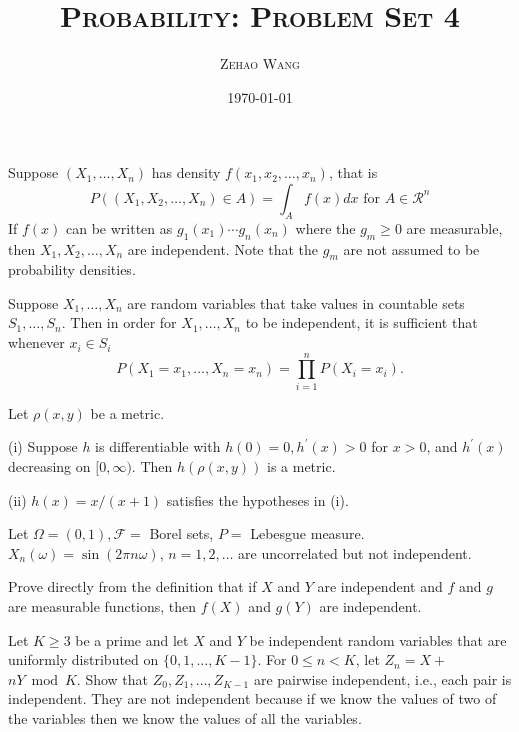\documentclass[en, normal, 11pt, black]{elegantnote}
\title{\textsc{Probability: Problem Set 4}}
\author{\textsc{Zehao Wang}}
\date{\today}
\newenvironment{exercise}[1]{\begin{tcolorbox}[colback=black!15, colframe=black!80, breakable, title=#1]}{\end{tcolorbox}}
\begin{document}
    \maketitle
    \begin{exercise}{2.1.1}
        Suppose $\left(X_{1}, \ldots, X_{n}\right)$ has density $f\left(x_{1}, x_{2}, \ldots, x_{n}\right)$, that is
        \[
        P\left(\left(X_{1}, X_{2}, \ldots, X_{n}\right) \in A\right)=\int_{A} f(x) d x \text { for } A \in \mathcal{R}^{n}
        \]
        If $f(x)$ can be written as $g_{1}\left(x_{1}\right) \cdots g_{n}\left(x_{n}\right)$ where the $g_{m} \geq 0$ are measurable, then $X_{1}, X_{2}, \ldots, X_{n}$ are independent. Note that the $g_{m}$ are not assumed to be probability densities. 
    \end{exercise}

    \begin{exercise}{2.1.2}
         Suppose $X_{1}, \ldots, X_{n}$ are random variables that take values in countable sets $S_{1}, \ldots, S_{n} .$ Then in order for $X_{1}, \ldots, X_{n}$ to be independent, it is sufficient that whenever $x_{i} \in S_{i}$
         \[
             P\left(X_{1}=x_{1}, \ldots, X_{n}=x_{n}\right)=\prod_{i=1}^{n} P\left(X_{i}=x_{i}\right). 
         \]
    \end{exercise}

    \begin{exercise}{2.1.3}
        Let $\rho(x, y)$ be a metric. 
        
        (i) Suppose $h$ is differentiable with $h(0)=0, h^{\prime}(x)>0$ for $x>0$, and $h^{\prime}(x)$ decreasing on $[0, \infty)$. Then $h(\rho(x, y))$ is a metric. 
        
        (ii) $h(x)=x /(x+1)$ satisfies the hypotheses in (i). 
    \end{exercise}

    \begin{exercise}{2.1.4}
        Let $\Omega=(0,1), \mathcal{F}=$ Borel sets, $P=$ Lebesgue measure. $X_{n}(\omega)=\sin (2 \pi n \omega)$, $n=1,2, \ldots$ are uncorrelated but not independent. 
    \end{exercise}

    \begin{exercise}{2.1.6}
        Prove directly from the definition that if $X$ and $Y$ are independent and $f$ and $g$ are measurable functions, then $f(X)$ and $g(Y)$ are independent.
    \end{exercise}

    \begin{exercise}{2.1.7}
        Let $K \geq 3$ be a prime and let $X$ and $Y$ be independent random variables that are uniformly distributed on $\{0,1, \ldots, K-1\} .$ For $0 \leq n<K$, let $Z_{n}=X+$ $n Y \bmod K$. Show that $Z_{0}, Z_{1}, \ldots, Z_{K-1}$ are pairwise independent, i.e., each pair is independent. They are not independent because if we know the values of two of the variables then we know the values of all the variables. 
    \end{exercise}
    
\end{document}
